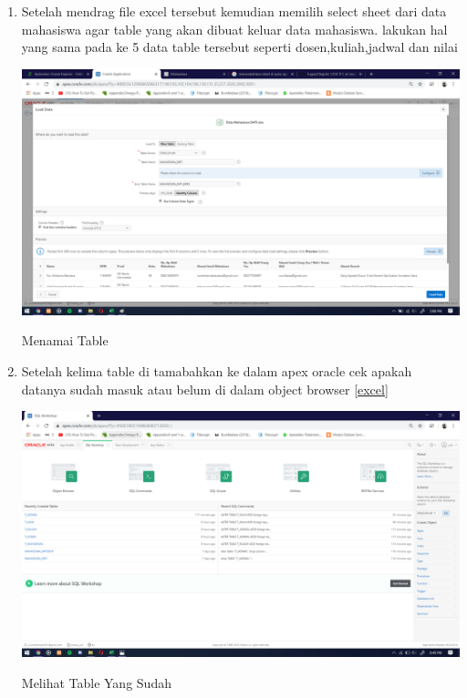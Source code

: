 \documentclass{article}
\begin{document}
\begin{enumerate}
     \item Setelah mendrag file excel tersebut kemudian memilih select sheet dari data mahasiswa agar table yang akan dibuat keluar data mahasiswa. lakukan hal yang sama pada ke 5 data table tersebut seperti dosen,kuliah,jadwal dan nilai
    \begin{center}
         \centering
            \includegraphics[scale=0.27]{figures/DB4.png}
        \caption{Menamai Table }
        \label{excel}
    \end{center}
    
     \item Setelah kelima table di tamabahkan ke dalam apex oracle cek apakah datanya sudah masuk atau belum di dalam object browser
      \ref{excel}
    \begin{center}
         \centering
            \includegraphics[scale=0.27]{figures/DB5.png}
        \caption{Melihat Table Yang Sudah}
        \label{excel}
    \end{center}
    

\end{enumerate}
\end{document}
